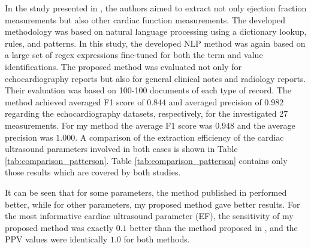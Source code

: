 In the study presented in \cite{patterson2017unlocking}, the authors aimed to extract not only ejection fraction measurements but also other cardiac function measurements. The developed methodology was based on natural language processing using a dictionary lookup, rules, and patterns. In this study, the developed NLP method was again based on a large set of regex expressions fine-tuned for both the term and value identifications. The proposed method was evaluated not only for echocardiography reports but also for general clinical notes and radiology reports. Their evaluation was based on 100-100 documents of each type of record. The method achieved averaged F1 score of $0.844$ and averaged precision of $0.982$ regarding the echocardiography datasets, respectively, for the investigated 27 measurements. For my method the average F1 score was $0.948$ and the average precision was $1.000$. A comparison of the extraction efficiency of the cardiac ultrasound parameters involved in both cases is shown in Table \ref{tab:comparison_patterson}. Table \ref{tab:comparison_patterson} contains only those results which are covered by both studies.

It can be seen that for some parameters, the method published in \cite{patterson2017unlocking} performed better, while for other parameters, my proposed method gave better results. For the most informative cardiac ultrasound parameter (EF), the sensitivity of my proposed method was exactly $0.1$ better than the method proposed in \cite{patterson2017unlocking}, and the PPV values were identically $1.0$ for both methods.

\begin{table}[h!]
	\caption[Comparison of results of my text mining-based information extraction method with the results achieved by the method presented by Patterson.]{Comparison of results of my text mining-based information extraction method with the results achieved by the method presented by Patterson \cite{patterson2017unlocking}.}
	\label{tab:comparison_patterson}
	\centering
\end{table}

